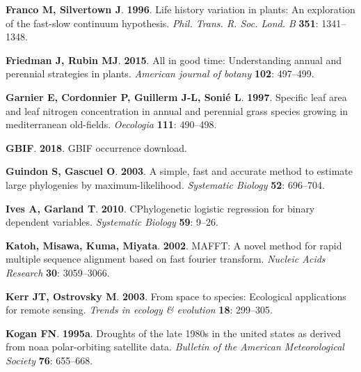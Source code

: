 \documentclass[man,floatsintext]{apa6}
\theoremstyle{definition}
\theoremstyle{definition}
\theoremstyle{definition}
\theoremstyle{remark}
\begin{document}
\leavevmode\hypertarget{ref-franco1996life}{}%
\textbf{\textnormal{Franco M}, \textnormal{Silvertown J}}.
\textbf{1996}. Life history variation in plants: An exploration of the
fast-slow continuum hypothesis. \emph{Phil. Trans. R. Soc. Lond. B}
\textbf{351}: 1341--1348.

\leavevmode\hypertarget{ref-friedman2015all}{}%
\textbf{\textnormal{Friedman J}, \textnormal{Rubin MJ}}. \textbf{2015}.
All in good time: Understanding annual and perennial strategies in
plants. \emph{American journal of botany} \textbf{102}: 497--499.

\leavevmode\hypertarget{ref-garnier1997specific}{}%
\textbf{\textnormal{Garnier E}, \textnormal{Cordonnier P},
\textnormal{Guillerm J-L}, \textnormal{Sonié L}}. \textbf{1997}.
Specific leaf area and leaf nitrogen concentration in annual and
perennial grass species growing in mediterranean old-fields.
\emph{Oecologia} \textbf{111}: 490--498.

\leavevmode\hypertarget{ref-gbifdownload}{}%
\textbf{\textnormal{GBIF}}. \textbf{2018}. GBIF occurrence download.

\leavevmode\hypertarget{ref-guindon2003a}{}%
\textbf{\textnormal{Guindon S}, \textnormal{Gascuel O}}. \textbf{2003}.
A simple, fast and accurate method to estimate large phylogenies by
maximum-likelihood. \emph{Systematic Biology} \textbf{52}: 696--704.

\leavevmode\hypertarget{ref-ives2010phylogenetic}{}%
\textbf{\textnormal{Ives A}, \textnormal{Garland T}}. \textbf{2010}.
CPhylogenetic logistic regression for binary dependent variables.
\emph{Systematic Biology} \textbf{59}: 9--26.

\leavevmode\hypertarget{ref-katoh2002mafft}{}%
\textbf{\textnormal{Katoh}, \textnormal{Misawa}, \textnormal{Kuma},
\textnormal{Miyata}}. \textbf{2002}. MAFFT: A novel method for rapid
multiple sequence alignment based on fast fourier transform.
\emph{Nucleic Acids Research} \textbf{30}: 3059--3066.

\leavevmode\hypertarget{ref-kerr2003space}{}%
\textbf{\textnormal{Kerr JT}, \textnormal{Ostrovsky M}}. \textbf{2003}.
From space to species: Ecological applications for remote sensing.
\emph{Trends in ecology \& evolution} \textbf{18}: 299--305.

\leavevmode\hypertarget{ref-kogan1995droughts}{}%
\textbf{\textnormal{Kogan FN}}. \textbf{1995a}. Droughts of the late
1980s in the united states as derived from noaa polar-orbiting satellite
data. \emph{Bulletin of the American Meteorological Society}
\textbf{76}: 655--668.
\end{document}
